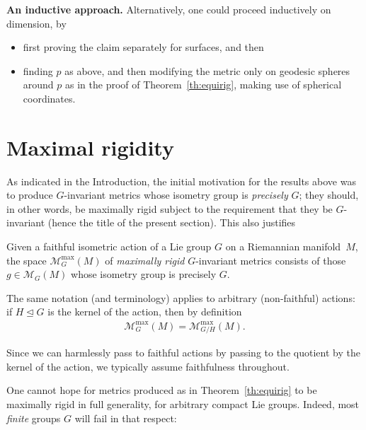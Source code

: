 \documentclass[pdftex]{sigma}%
\numberwithin{equation}{section}
\begin{document}
\medskip

{\bf An inductive approach.} Alternatively, one could proceed inductively on dimension, by
\begin{itemize}\itemsep=0pt
\item first proving the claim separately for surfaces, and then
\item finding $p$ as above, and then modifying the metric only on geodesic spheres around $p$ as in the proof of Theorem~\ref{th:equirig}, making use of spherical coordinates.
\end{itemize}

\section{Maximal rigidity}\label{se:maxrig}

As indicated in the Introduction, the initial motivation for the results above was to produce $G$-invariant metrics whose isometry group is {\it precisely} $G$; they should, in other words, be maximally rigid subject to the requirement that they be $G$-invariant (hence the title of the present section). This also justifies

\begin{Notation}
 Given a faithful isometric action of a Lie group $G$ on a Riemannian manifold~$M$, the space $\mathcal{M}_G^{\max}(M)$ of {\it maximally rigid} $G$-invariant metrics consists of those $g\in \mathcal{M}_G(M)$ whose isometry group is precisely $G$.

 The same notation (and terminology) applies to arbitrary (non-faithful) actions: if $H\trianglelefteq G$ is the kernel of the action, then by definition
 \begin{gather*}
 \mathcal{M}_G^{\max}(M) = \mathcal{M}_{G/H}^{\max}(M).
 \end{gather*}
\end{Notation}
Since we can harmlessly pass to faithful actions by passing to the quotient by the kernel of the action, we typically assume faithfulness throughout.

One cannot hope for metrics produced as in Theorem~\ref{th:equirig} to be maximally rigid in full generality, for arbitrary compact Lie groups. Indeed, most {\it finite} groups $G$ will fail in that respect:
\end{document}
